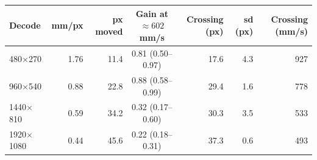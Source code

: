 \begin{tabular}{@{}lrrcrrr@{}}
\toprule
Decode & mm/px & px moved & Gain at $\approx 602$ mm/s & Crossing (px) & sd (px) & Crossing (mm/s) \\
\midrule
480$\times$270 & 1.76 & 11.4 & 0.81 (0.50--0.97) & 17.6 & 4.3 & 927 \\
960$\times$540 & 0.88 & 22.8 & 0.88 (0.58--0.99) & 29.4 & 1.6 & 778 \\
1440$\times$810 & 0.59 & 34.2 & 0.32 (0.17--0.60) & 30.3 & 3.5 & 533 \\
1920$\times$1080 & 0.44 & 45.6 & 0.22 (0.18--0.31) & 37.3 & 0.6 & 493 \\
\bottomrule
\end{tabular}
